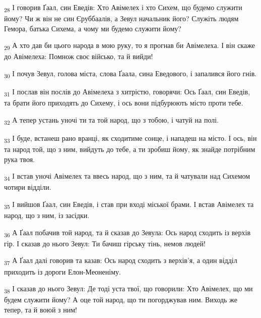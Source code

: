 \begin{tcolorbox}
\textsubscript{28} І говорив Ґаал, син Еведів: Хто Авімелех і хто Сихем, що будемо служити йому? Чи ж він не син Єруббаалів, а Зевул начальник його? Служіть людям Гемора, батька Сихема, а чому ми будемо служити йому?
\end{tcolorbox}
\begin{tcolorbox}
\textsubscript{29} А хто дав би цього народа в мою руку, то я прогнав би Авімелеха. І він скаже до Авімелеха: Помнож своє військо, та й вийди!
\end{tcolorbox}
\begin{tcolorbox}
\textsubscript{30} І почув Зевул, голова міста, слова Ґаала, сина Еведового, і запалився його гнів.
\end{tcolorbox}
\begin{tcolorbox}
\textsubscript{31} І послав він послів до Авімелеха з хитрістю, говорячи: Ось Ґаал, син Еведів, та брати його приходять до Сихему, і ось вони підбурюють місто проти тебе.
\end{tcolorbox}
\begin{tcolorbox}
\textsubscript{32} А тепер устань уночі ти та той народ, що з тобою, і чатуй на полі.
\end{tcolorbox}
\begin{tcolorbox}
\textsubscript{33} І буде, встанеш рано вранці, як сходитиме сонце, і нападеш на місто. І ось, він та народ той, що з ним, вийдуть до тебе, а ти зробиш йому, як знайде потрібним рука твоя.
\end{tcolorbox}
\begin{tcolorbox}
\textsubscript{34} І встав уночі Авімелех та ввесь народ, що з ним, та й чатували над Сихемом чотири відділи.
\end{tcolorbox}
\begin{tcolorbox}
\textsubscript{35} І вийшов Ґаал, син Еведів, і став при вході міської брами. І встав Авімелех та народ, що з ним, із засідки.
\end{tcolorbox}
\begin{tcolorbox}
\textsubscript{36} А Ґаал побачив той народ, та й сказав до Зевула: Ось народ сходить із верхів гір. І сказав до нього Зевул: Ти бачиш гірську тінь, немов людей!
\end{tcolorbox}
\begin{tcolorbox}
\textsubscript{37} А Ґаал далі говорив та казав: Ось народ сходить з верхів'я, а один відділ приходить із дороги Елон-Меоненіму.
\end{tcolorbox}
\begin{tcolorbox}
\textsubscript{38} І сказав до нього Зевул: Де тоді уста твої, що говорили: Хто Авімелех, що ми будем служити йому? А оце той народ, що ти погорджував ним. Виходь же тепер, та й воюй з ним!
\end{tcolorbox}
